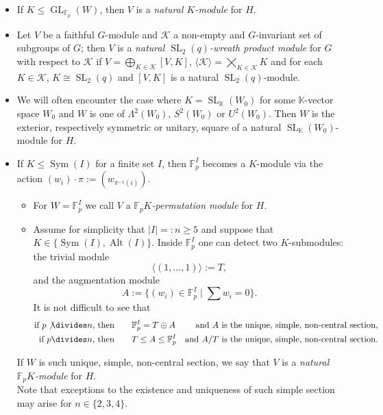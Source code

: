 \documentclass{amsart}
\numberwithin{equation}{section}
\theoremstyle{definition}
\theoremstyle{subresult}
\theoremstyle{caseresult}
\newcommand{\bF}{\mathbb{F}}
\newcommand{\bK}{\mathbb{K}}
\newcommand{\K}{\mathcal{K}}
\newcommand{\SL}{\operatorname{SL}}
\newcommand{\Sp}{\operatorname{Sp}}
\newcommand{\Sym}{\operatorname{Sym}}
\newcommand{\Alt}{\operatorname{Alt}}
\newcommand{\GL}{\operatorname{GL}}
\newcommand{\inv}{^{-1}}
\newcommand{\<}{\langle}
\renewcommand{\>}{\rangle}
\begin{document}
	\begin{itemize}
		\item If $K \le \GL_{\bF_p}(W)$, then $V$ is a \emph{natural $K$-module} for $H$.
		\item Let $V$ be a faithful $G$-module and $\K$ a non-empty and $G$-invariant set of subgroups of $G$; then $V$ is a \emph{natural $\SL_2(q)$-wreath product module} for $G$ with respect to $\K$ if $\displaystyle V = \bigoplus_{K \in \K} [V,K]$, $\displaystyle \<\K\> = \bigtimes_{K \in \K} K$ and for each $K \in \K$, $K \cong \SL_2(q)$ and $[V,K]$ is a natural $\SL_2(q)$-module.
		\item We will often encounter the case where $K=\SL_\bK(W_0)$ for some $\bK$-vector space $W_0$ and $W$ is one of $\Lambda^2(W_0)$, $S^2(W_0)$ or $U^2(W_0)$. Then $W$ is the exterior, respectively symmetric or unitary, square of a natural $\SL_\bK(W_0)$-module for $H$.
		\item If $K \le \Sym(I)$ for a finite set $I$, then $\bF_p^I$ becomes a $K$-module via the action $(w_i) \cdot \pi := (w_{\pi\inv(i)})$.
		\begin{itemize}
			\item For $W = \bF_p^I$ we call $V$ a \emph{$\bF_pK$-permutation module} for $H$.
			\item Assume for simplicity that $|I|=: n \ge 5$ and suppose that $K \in \{\Sym(I), \Alt(I)\}$. Inside $\bF_p^I$ one can detect two $K$-submodules: the trivial module 
			\[
			 \< (1,\dots,1) \> := T,
			\]
			and the augmentation module
			\[
				A := \{(w_i) \in \bF_p^I \mid \sum w_i =0 \}.
			\]
			It is not difficult to see that
			\begin{align*}
				\text{if $p \not \divides n$, then} \qquad & \bF_p^I = T \oplus A & \text{and $A$ is the unique, simple, non-central section,} \\
				\text{if $p \divides n$, then} \qquad & T \le A \le \bF_p^I  & \text{and $A/T$ is the unique, simple, non-central section}. 
			\end{align*}
		\end{itemize}
		If $W$ is such unique, simple, non-central section, we say that $V$ is a \emph{natural $\bF_p K$-module} for $H$.\\
		Note that exceptions to the existence and uniqueness of such simple section may arise for $n \in \{2,3,4\}$.

\end{itemize}
\end{document}
